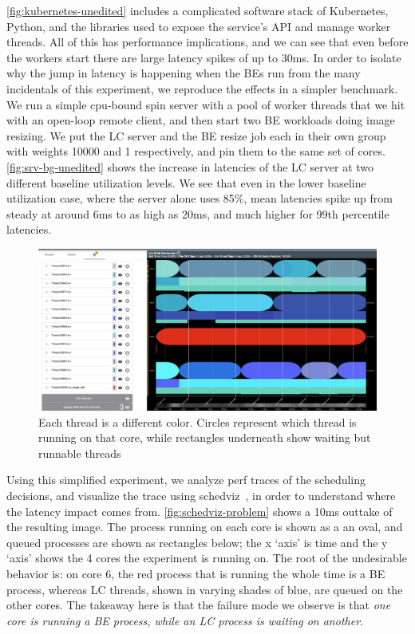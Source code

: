 \autoref{fig:kubernetes-unedited} includes a complicated software stack of
Kubernetes, Python, and the libraries used to expose the service's API and
manage worker threads. All of this has performance implications, and we can see
that even before the workers start there are large latency spikes of up to 30ms.
In order to isolate why the jump in latency is happening when the BEs run from
the many incidentals of this experiment, we reproduce the effects in a simpler
benchmark. We run a simple cpu-bound spin server with a pool of worker threads
that we hit with an open-loop remote client, and then start two BE workloads
doing image resizing. We put the LC server and the BE resize job each in their
own \cgroups{} group with weights 10000 and 1 respectively, and pin them to the
same set of cores. \autoref{fig:srv-bg-unedited} shows the increase in latencies
of the LC server at two different baseline utilization levels. We see that even
in the lower baseline utilization case, where the server alone uses 85\%, mean
latencies spike up from steady at around 6ms to as high as 20ms, and much higher
for 99th percentile latencies.

\begin{figure}[t]
    \centering
    \includegraphics[width=\columnwidth]{graphs/schedviz-problem.png}
    \caption{Each thread is a different color. Circles represent which
    thread is running on that core, while rectangles underneath show waiting but
    runnable threads
    }\label{fig:schedviz-problem}
\end{figure}

Using this simplified experiment, we analyze perf traces of the scheduling
decisions, and visualize the trace using schedviz~\cite{schedviz-tool}, in order
to understand where the latency impact comes from.
\autoref{fig:schedviz-problem} shows a 10ms outtake of the resulting image. The
process running on each core is shown as a an oval, and queued processes are
shown as rectangles below; the x `axis' is time and the y `axis' shows the 4
cores the experiment is running on. The root of the undesirable behavior is: on
core 6, the red process that is running the whole time is a BE process, whereas
LC threads, shown in varying shades of blue, are queued on the other cores. The
takeaway here is that the failure mode we observe is that \textit{one core is
running a BE process, while an LC process is waiting on another}.

